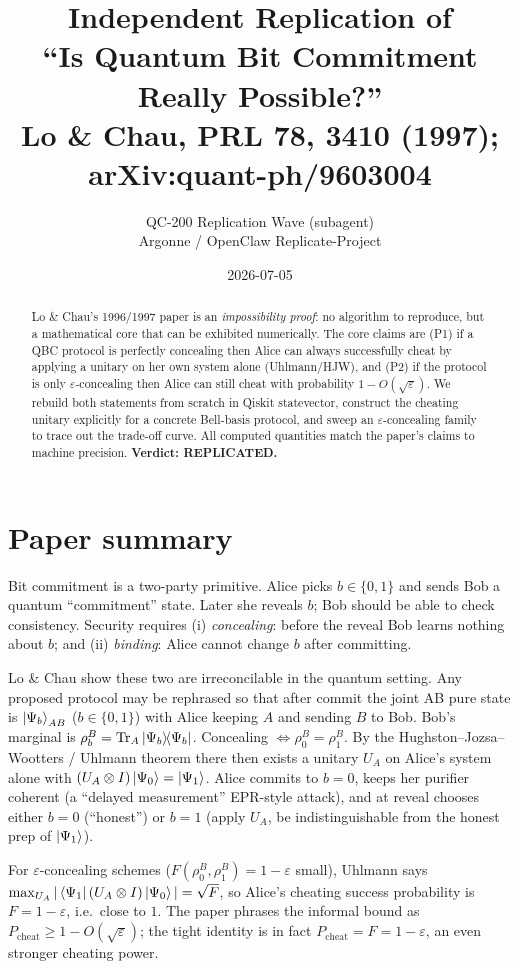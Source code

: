 \documentclass[11pt]{article}
\title{Independent Replication of\\
       ``Is Quantum Bit Commitment Really Possible?''\\
       \normalsize Lo \& Chau, PRL \textbf{78}, 3410 (1997); arXiv:quant-ph/9603004}
\author{QC-200 Replication Wave (subagent)\\
        Argonne / OpenClaw Replicate-Project}
\date{2026-07-05}
\begin{document}
\maketitle

\begin{abstract}
Lo \& Chau's 1996/1997 paper is an \emph{impossibility proof}: no algorithm
to reproduce, but a mathematical core that can be exhibited numerically.
The core claims are (P1) if a QBC protocol is perfectly concealing then
Alice can always successfully cheat by applying a unitary on her own
system alone (Uhlmann/HJW), and (P2) if the protocol is only
$\varepsilon$-concealing then Alice can still cheat with probability
$1-O(\sqrt{\varepsilon})$.  We rebuild both statements from scratch in
Qiskit statevector, construct the cheating unitary explicitly for a
concrete Bell-basis protocol, and sweep an $\varepsilon$-concealing family
to trace out the trade-off curve.  All computed quantities match the
paper's claims to machine precision.  \textbf{Verdict: REPLICATED.}
\end{abstract}

\section{Paper summary}

Bit commitment is a two-party primitive.  Alice picks $b\in\{0,1\}$ and
sends Bob a quantum ``commitment'' state.  Later she reveals $b$; Bob
should be able to check consistency.  Security requires (i)
\emph{concealing}: before the reveal Bob learns nothing about $b$; and
(ii) \emph{binding}: Alice cannot change $b$ after committing.

Lo \& Chau show these two are irreconcilable in the quantum setting.  Any
proposed protocol may be rephrased so that after commit the joint AB pure
state is $\ket{\Psi_b}_{AB}$ ($b\in\{0,1\}$) with Alice keeping $A$ and
sending $B$ to Bob.  Bob's marginal is $\rho^B_b = \Tr_A\ketbra{\Psi_b}$.
Concealing $\Leftrightarrow \rho^B_0 = \rho^B_1$.  By the
Hughston--Jozsa--Wootters / Uhlmann theorem there then exists a unitary
$U_A$ on Alice's system alone with $(U_A\otimes I)\ket{\Psi_0}=\ket{\Psi_1}$.
Alice commits to $b=0$, keeps her purifier coherent (a ``delayed
measurement'' EPR-style attack), and at reveal chooses either $b=0$
(``honest'') or $b=1$ (apply $U_A$, be indistinguishable from the honest
prep of $\ket{\Psi_1}$).

For $\varepsilon$-concealing schemes ($F(\rho^B_0,\rho^B_1)=1-\varepsilon$
small), Uhlmann says $\max_{U_A}|\bra{\Psi_1}(U_A\otimes I)\ket{\Psi_0}|=
\sqrt{F}$, so Alice's cheating success probability is $F=1-\varepsilon$,
i.e.\ close to $1$.  The paper phrases the informal bound as
$P_\mathrm{cheat}\geq 1-O(\sqrt{\varepsilon})$; the tight identity is in
fact $P_\mathrm{cheat}=F=1-\varepsilon$, an even stronger cheating power.
\end{document}
